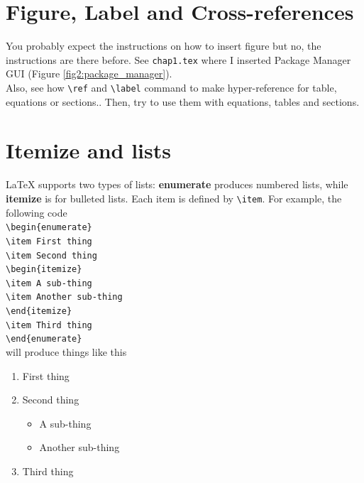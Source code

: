 \cleardoublepage

 \section{Figure, Label and Cross-references}
 You probably expect the instructions on how to insert figure but no, the instructions are there
before. See
 \verb+chap1.tex+ where I inserted Package Manager GUI (Figure \ref{fig2:package_manager}).\\
 
 Also, see how \verb+\ref+ and \verb+\label+ command to make hyper-reference for table, equations or
sections.. Then, try to use them with equations, tables and sections.

\section{Itemize and lists}
{\LaTeX} supports two types of lists: \textbf{enumerate} produces numbered lists, while \textbf{itemize} is for bulleted lists. Each item is defined by \verb+\item+. For example, the following code\\

\verb+\begin{enumerate}+\\
\indent\verb+\item First thing+\\
 \indent\verb+\item Second thing+\\
 \indent\verb+\begin{itemize}+\\
 \indent\verb+\item A sub-thing+\\
 \indent\verb+\item Another sub-thing+\\
 \indent\verb+\end{itemize}+\\
\indent\verb+\item Third thing+\\
\indent\verb+\end{enumerate}+\\
 
 \noindent will produce things like this\\
 \begin{enumerate}
     \item First thing
     \item Second thing
     \begin{itemize}
     \item A sub-thing
     \item Another sub-thing
     \end{itemize}
     \item Third thing
     \end{enumerate}

